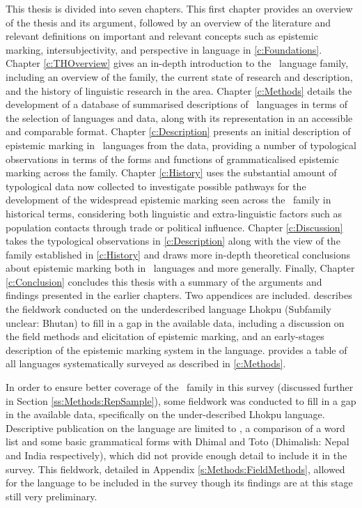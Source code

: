 This thesis is divided into seven chapters. This first chapter provides an overview of the thesis and its argument, followed by an overview of the literature and relevant definitions on important and relevant concepts such as epistemic marking, intersubjectivity, and perspective in language in \cref{c:Foundations}. Chapter \ref{c:THOverview} gives an in-depth introduction to the \lfam\ language family, including an overview of the family, the current state of research and description, and the history of linguistic research in the area. Chapter \ref{c:Methods} details the development of a database of summarised descriptions of \lfam\ languages in terms of the selection of languages and data, along with its representation in an accessible and comparable format. Chapter \ref{c:Description} presents an initial description of epistemic marking in \lfam\ languages from the data, providing a number of typological observations in terms of the forms and functions of grammaticalised epistemic marking across the family. Chapter \ref{c:History} uses the substantial amount of typological data now collected to investigate possible pathways for the development of the widespread epistemic marking seen across the \lfam\ family in historical terms, considering both linguistic and extra-linguistic factors such as population contacts through trade or political influence. Chapter \ref{c:Discussion} takes the typological observations in \cref{c:Description} along with the view of the family established in \cref{c:History} and draws more in-depth theoretical conclusions about epistemic marking both in \lfam\ languages and more generally. Finally, Chapter \ref{c:Conclusion} concludes this thesis with a summary of the arguments and findings presented in the earlier chapters. Two appendices are included.  describes the fieldwork conducted on the underdescribed language Lhokpu (Subfamily unclear: Bhutan) to fill in a gap in the available data, including a discussion on the field methods and elicitation of epistemic marking, and an early-stages description of the epistemic marking system in the language.  provides a table of all languages systematically surveyed as described in \cref{c:Methods}.

In order to ensure better coverage of the \lfam\ family in this survey (discussed further in Section \ref{ss:Methods:RepSample}), some fieldwork was conducted to fill in a gap in the available data, specifically on the under-described Lhokpu language. Descriptive publication on the language are limited to , a comparison of a word list and some basic grammatical forms with Dhimal and Toto (Dhimalish: Nepal and India respectively), which did not provide enough detail to include it in the survey. This fieldwork, detailed in Appendix \ref{s:Methods:FieldMethods}, allowed for the language to be included in the survey though its findings are at this stage still very preliminary.  

